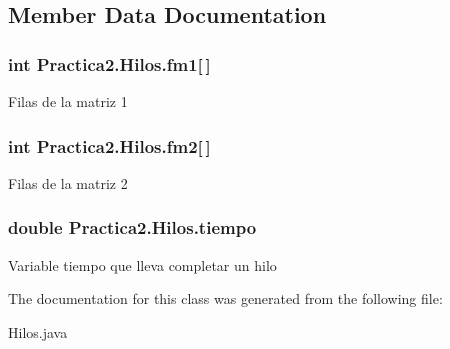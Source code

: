 \subsection{Member Data Documentation}
\hypertarget{class_practica2_1_1_hilos_a90961d2fd4d91c83c8b89fa80f079902}{}
\subsubsection[{fm1}]{\setlength{\rightskip}{0pt plus 5cm}int Practica2.\+Hilos.\+fm1\mbox{[}$\,$\mbox{]}}\label{class_practica2_1_1_hilos_a90961d2fd4d91c83c8b89fa80f079902}
Filas de la matriz 1 \hypertarget{class_practica2_1_1_hilos_aeed8873453657337fb1a6143578e72fb}{}
\subsubsection[{fm2}]{\setlength{\rightskip}{0pt plus 5cm}int Practica2.\+Hilos.\+fm2\mbox{[}$\,$\mbox{]}}\label{class_practica2_1_1_hilos_aeed8873453657337fb1a6143578e72fb}
Filas de la matriz 2 \hypertarget{class_practica2_1_1_hilos_aaff16bd21f926b0ff36f677f79c87bd7}{}
\subsubsection[{tiempo}]{\setlength{\rightskip}{0pt plus 5cm}double Practica2.\+Hilos.\+tiempo}\label{class_practica2_1_1_hilos_aaff16bd21f926b0ff36f677f79c87bd7}
Variable tiempo que lleva completar un hilo 

The documentation for this class was generated from the following file\+:\begin{DoxyCompactItemize}
\item 
Hilos.\+java\end{DoxyCompactItemize}
